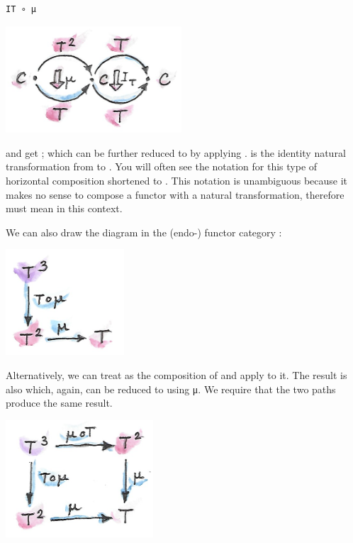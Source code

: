 \begin{verbatim}
IT ∘ μ
\end{verbatim}

\includegraphics[width=2.58333in]{images/assoc1.png}

and get ; which can be further reduced to  by
applying .  is the identity natural transformation
from  to . You will often see the notation for this
type of horizontal composition  shortened to
. This notation is unambiguous because it makes no sense to
compose a functor with a natural transformation, therefore 
must mean  in this context.

We can also draw the diagram in the (endo-) functor category
\code{{[}C,\ C{]}}:

\includegraphics[width=1.73958in]{images/assoc2.png}

Alternatively, we can treat  as the composition of
 and apply  to it. The result is also
 which, again, can be reduced to  using μ. We
require that the two paths produce the same result.

\includegraphics[width=2.16667in]{images/assoc.png}

